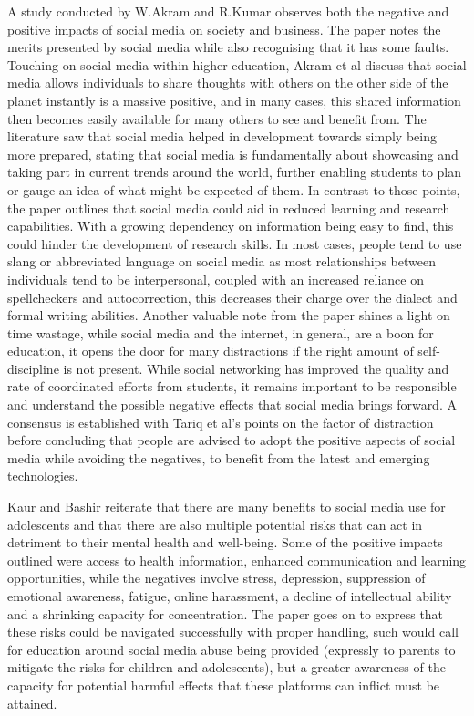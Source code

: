 \documentclass[lettersize,journal]{IEEEtran}
\begin{document}
    A study conducted by W.Akram and R.Kumar \cite{Akram et al 2017} observes both the negative
    and positive impacts of social media on society and business.  The paper notes the merits presented by social media
    while also recognising that it has some faults. Touching on social media within higher education, Akram et al
    discuss that social media allows individuals to share thoughts with others on the other side of the planet instantly
    is a massive positive, and in many cases, this shared information then becomes easily available for many others to
    see and benefit from. The literature saw that social media helped in development towards simply being more prepared, stating that
    social media is fundamentally about showcasing and taking part in  current trends around the world, further enabling students
    to plan or gauge an idea of what might be expected of them. In contrast to those points, the paper outlines that
    social media could aid in reduced learning and research capabilities. With a growing dependency on information
    being easy to find, this could hinder the development of research skills. In most cases, people tend to use slang or
    abbreviated language on social media as most relationships between individuals tend to be interpersonal, coupled
    with an increased reliance on spellcheckers and autocorrection, this decreases their charge over the dialect and
    formal writing abilities. Another valuable note from the paper shines a light on time wastage, while social media
    and the internet, in general, are a boon for education, it opens the door for many distractions if the right amount
    of self-discipline is not present. While social networking has improved the quality and rate of coordinated
    efforts from students, it remains important to be responsible and understand the possible negative effects
    that social media brings forward. A consensus is established with Tariq et al's \cite{Tariq et al 2012}
    points on the factor of distraction before concluding that people are advised to adopt the positive aspects of
    social media while avoiding the negatives, to benefit from the latest and emerging technologies.

    Kaur and Bashir \cite{Bashir et al 2015} reiterate that there are many benefits to social media use
    for adolescents and that there are also multiple potential risks that can act in detriment to their
    mental health and well-being. Some of the positive impacts outlined were access to health information,
    enhanced communication and learning opportunities, while the negatives involve stress, depression,
    suppression of emotional awareness, fatigue, online harassment, a decline of intellectual ability
    and a shrinking capacity for concentration. The paper goes on to express that these risks could be
    navigated successfully with proper handling, such would call for education around social media abuse
    being provided (expressly to parents to mitigate the risks for children and adolescents), but a greater
    awareness of the capacity for potential harmful effects that these platforms can inflict must be attained.
\end{document}
